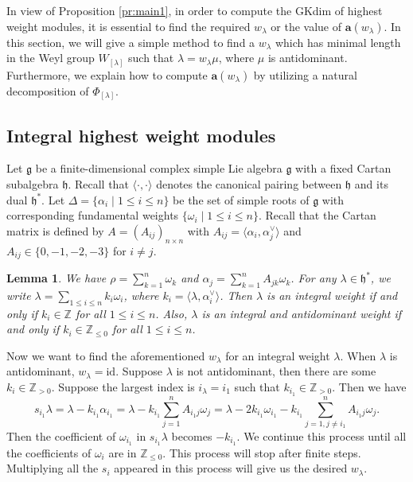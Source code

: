 \documentclass[reqno,12pt]{amsart}
\numberwithin{equation}{section}
\theoremstyle{plain}
\newtheorem{Lem}[Thm]{Lemma}
\theoremstyle{definition}
\newcommand{\lam}{\lambda}
\newcommand{\aff}{ \mathbf{a} }
\newcommand{\lest}{\leqslant}
\begin{document}
In view of Proposition \ref{pr:main1}, in order to compute the GKdim of  highest weight modules, it is essential to find the required $w_{\lam}$  or the value of $\aff(w_{\lam})$. In this section, we will give a simple method to find a $w_{\lam}$ which has minimal length in the Weyl group $W_{[\lam]}$ such that $\lam=w_{\lam}\mu$, where $\mu $ is antidominant. Furthermore, we explain how to compute $\aff(w_\lambda)$ by utilizing a natural decomposition of $\Phi_{[\lambda]}$.

\subsection{Integral highest weight modules}\label{inte-a}

Let $\mathfrak{g}$ be a finite-dimensional complex simple Lie algebra $\mathfrak{g}$ with a fixed Cartan subalgebra $\mathfrak{h}$. Recall that $\langle \cdot, \cdot\rangle$ denotes the canonical pairing between  $\mathfrak{h}$ and its dual $\mathfrak{h}^*$. Let $\Delta=\{\alpha_i \mid  1\lest i\lest n\}$ be the set of simple roots of $\mathfrak{g}$ with corresponding fundamental weights $\{\omega_i\mid 1\lest i\lest n\}$. 
Recall that the Cartan matrix is defined by
$A=(A_{ij})_{n\times n}$ with $A_{ij}=\langle \alpha_i, \alpha_j^\vee \rangle$ and $A_{ij}\in \{0,-1,-2,-3\}$ for $i \neq j$.


\begin{Lem}\label{rho}
   We have $\rho=\sum\limits_{k=1}^n \omega_k$ and 
   $\alpha_j=\sum\limits_{k=1}^n A_{jk}\omega_k$. For any $\lam\in \mathfrak{h}^*$, we write $\lam=\sum\limits_{1\lest i\lest n}k_i\omega_i$, where $k_i=\langle \lam, \alpha_i^{\vee}\rangle$. Then $\lam$ is an integral weight if and only if $k_i\in \mathbb{Z}$ for all $1\lest i\lest n$. Also, $\lam$ is an integral and antidominant weight if and only if   $k_i\in \mathbb{Z}_{\lest 0}$ for  all $1\lest i\lest n$.
\end{Lem}

Now we want to find the aforementioned  $w_{\lam}$ for an integral weight $\lambda$. When $\lam$ is antidominant, $w_{\lam}=\mathrm{id}$. Suppose $\lam$ is not antidominant, then there are some $k_i\in \mathbb{Z}_{>0}$. Suppose the largest index is $i_{\lam}={i_1}$ such that $k_{i_1}\in \mathbb{Z}_{>0}$. Then we have $$s_{i_1}\lam=\lam-k_{i_1}\alpha_{i_1}=\lam-k_{i_1}\sum\limits_{j=1}^n A_{i_1j}\omega_j=\lam-2k_{i_1}\omega_{i_1}-k_{i_1}\sum\limits_{j=1,j\neq i_1}^n A_{i_1j}\omega_j.$$
 Then the coefficient of $\omega_{i_1}$ in $s_{i_1}\lam$ becomes $-k_{i_1}$. We continue this process until all the coefficients of $\omega_{i}$ are in $\mathbb{Z}_{\lest 0}$. This process will stop after finite steps. Multiplying all the $s_i$ appeared in this process will give us the desired $w_{\lam}$.
\end{document}
